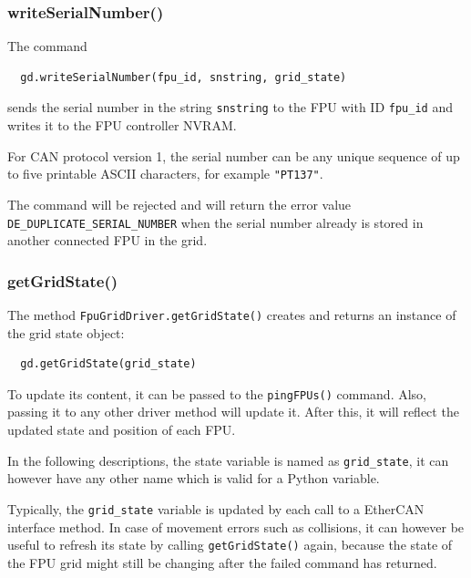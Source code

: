 \documentclass[11pt,a4paper]{scrartcl}
\begin{document}
\subsubsection{writeSerialNumber()}

The command
\begin{verbatim}
  gd.writeSerialNumber(fpu_id, snstring, grid_state)
\end{verbatim}
sends the serial number in the string \texttt{snstring}
to the FPU with ID \texttt{fpu\_id} and writes it
to the FPU controller NVRAM.

For CAN protocol version 1, the serial number can be any unique
sequence of up to five printable ASCII characters, for example
\texttt{"PT137"}.

\begin{sloppypar}
 The command will be rejected and
will return the error value \texttt{DE\_DUPLICATE\_SERIAL\_NUMBER}
when the serial number already is stored in another connected FPU in
the grid.
\end{sloppypar}



\subsubsection{getGridState()}
The method \texttt{FpuGridDriver.getGridState()} creates and returns
an instance of the grid state object:

\begin{verbatim}
  gd.getGridState(grid_state)
\end{verbatim}

To update its content, it can be passed to the \texttt{pingFPUs()}
command. Also, passing it to any other driver method will update
it. After this, it will reflect the updated state and position of each
FPU.

In the following descriptions, the state variable is named as
\texttt{grid\_state}, it can however have any other name which is
valid for a Python variable.

Typically, the \texttt{grid\_state} variable is updated by each call
to a EtherCAN interface method. In case of movement errors such as collisions, it
can however be useful to refresh its state by calling
\texttt{getGridState()} again, because the state of the FPU grid might
still be changing after the failed command has returned.
\end{document}
